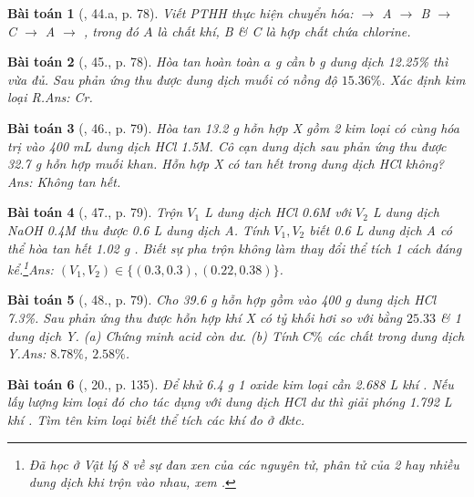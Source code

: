 \documentclass{article}
\newtheorem{baitoan}{Bài toán}
\begin{document}
\begin{baitoan}[\cite{An_Hoa_Hoc_nang_cao_8_9}, 44.a, p. 78]
	Viết {\rm PTHH} thực hiện chuyển hóa: {\rm{} $\to$ A $\to$ B $\to$ C $\to$ A $\to$ }, trong đó $A$ là chất khí, B \& C là hợp chất chứa chlorine.
\end{baitoan}

\begin{baitoan}[\cite{An_Hoa_Hoc_nang_cao_8_9}, 45., p. 78]
	Hòa tan hoàn toàn $a$ {\rm g } cần $b$ {\rm g} dung dịch {\rm{} 12.25\%} thì vừa đủ. Sau phản ứng thu được dung dịch muối có nồng độ $15.36\%$. Xác định kim loại R.\hfill{\sf Ans: Cr.}
\end{baitoan}

\begin{baitoan}[\cite{An_Hoa_Hoc_nang_cao_8_9}, 46., p. 79]
	Hòa tan {\rm13.2 g} hỗn hợp X gồm 2 kim loại có cùng hóa trị vào {\rm400 mL} dung dịch {\rm HCl 1.5M}. Cô cạn dung dịch sau phản ứng thu được {\rm32.7 g} hỗn hợp muối khan. Hỗn hợp X có tan hết trong dung dịch {\rm HCl} không?\hfill{\sf Ans: Không tan hết.}
\end{baitoan}

\begin{baitoan}[\cite{An_Hoa_Hoc_nang_cao_8_9}, 47., p. 79]
	Trộn $V_1$ {\rm L} dung dịch {\rm HCl 0.6M} với $V_2$ {\rm L} dung dịch {\rm NaOH 0.4M} thu được {\rm0.6 L} dung dịch A. Tính $V_1,V_2$ biết {\rm0.6 L} dung dịch A có thể hòa tan hết {\rm1.02 g }. Biết sự pha trộn không làm thay đổi thể tích 1 cách đáng kể.\footnote{Đã học ở Vật lý 8 về sự đan xen của các nguyên tử, phân tử của 2 hay nhiều dung dịch khi trộn vào nhau, xem \cite[\S19, pp. 68--70]{SGK_Vat_Ly_8}.}\hfill{\sf Ans: $(V_1,V_2)\in\{(0.3,0.3),(0.22,0.38)\}$.}
\end{baitoan}

\begin{baitoan}[\cite{An_Hoa_Hoc_nang_cao_8_9}, 48., p. 79]
	Cho {\rm39.6 g} hỗn hợp gồm {\rm{}} vào {\rm400 g} dung dịch {\rm HCl 7.3\%}. Sau phản ứng thu được hỗn hợp khí X có tỷ khối hơi so với {\rm{}} bằng $25.33$ \& 1 dung dịch Y. (a) Chứng minh acid còn dư. (b) Tính $C\%$ các chất trong dung dịch Y.\hfill{\sf Ans: $8.78\%$, $2.58\%$.}
\end{baitoan}

\begin{baitoan}[\cite{An_Hoa_Hoc_nang_cao_8_9}, 20., p. 135]
	Để khử {\rm6.4 g} 1 oxide kim loại cần {\rm2.688 L} khí {\rm{}}. Nếu lấy lượng kim loại đó cho tác dụng với dung dịch {\rm HCl} dư thì giải phóng {\rm1.792 L} khí {\rm{}}. Tìm tên kim loại biết thể tích các khí đo ở đktc.
\end{baitoan}
\end{document}
